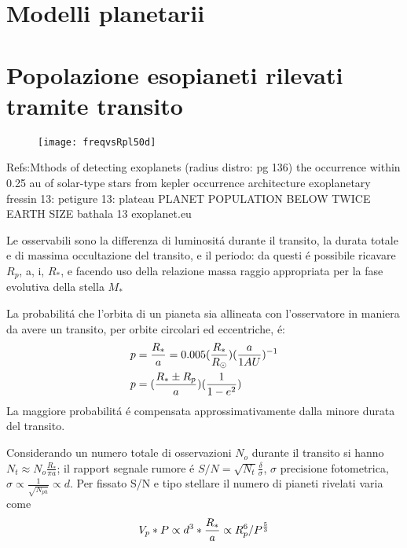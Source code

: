 \section{Modelli planetarii}


\section{Popolazione esopianeti rilevati tramite transito}

\begin{figure}[!ht]
\texttt{[image: freqvsRpl50d]}
\end{figure}

\begin{workout}
Refs:Mthods of detecting exoplanets (radius distro: pg 136)
the occurrence within 0.25 au of solar-type stars from kepler
occurrence architecture exoplanetary
fressin 13: 
petigure 13: plateau PLANET POPULATION BELOW TWICE EARTH SIZE
bathala 13
exoplanet.eu
\end{workout}

Le osservabili sono la differenza di luminosit\'a durante il transito, la durata totale e di massima occultazione del transito, e il periodo: da questi \'e possibile ricavare $R_p$, a, i, $R_*$, e facendo uso della relazione massa raggio appropriata per la fase evolutiva della stella $M_*$

La probabilit\'a che l'orbita di un pianeta sia allineata con l'osservatore in maniera da avere un transito, per orbite circolari ed eccentriche, \'e:
\begin{align*}
&p=\frac{R_*}{a}=0.005(\frac{R_*}{R_{\odot}{}})(\frac{a}{1AU})^{-1}\\
&p=(\frac{R_*\pm R_p}{a})(\frac{1}{1-e^2})
\end{align*}
La maggiore probabilit\'a \'e compensata approssimativamente dalla minore durata del transito.

\begin{workout}
Considerando un numero totale di osservazioni $N_o$ durante il transito si hanno $N_t\approx N_o\frac{R_*}{\pi a}$; il rapport segnale rumore \'e $S/N=\sqrt{N_t}\frac{\delta}{\sigma}$, $\sigma$ precisione fotometrica, $\sigma\propto\frac{1}{\sqrt{N_{ph}}}\propto d$. Per fissato S/N e tipo stellare il numero di pianeti rivelati varia come
\begin{equation}
V_p*P\propto d^3*\frac{R_*}{a}\propto R_p^6/P^{\frac{5}{3}}
\end{equation}
\end{workout}

